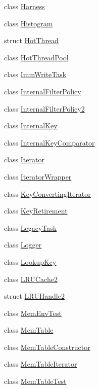 \begin{DoxyCompactItemize}
class \hyperlink{classleveldb_1_1_harness}{Harness}
\item 
class \hyperlink{classleveldb_1_1_histogram}{Histogram}
\item 
struct \hyperlink{structleveldb_1_1_hot_thread}{Hot\+Thread}
\item 
class \hyperlink{classleveldb_1_1_hot_thread_pool}{Hot\+Thread\+Pool}
\item 
class \hyperlink{classleveldb_1_1_imm_write_task}{Imm\+Write\+Task}
\item 
class \hyperlink{classleveldb_1_1_internal_filter_policy}{Internal\+Filter\+Policy}
\item 
class \hyperlink{classleveldb_1_1_internal_filter_policy2}{Internal\+Filter\+Policy2}
\item 
class \hyperlink{classleveldb_1_1_internal_key}{Internal\+Key}
\item 
class \hyperlink{classleveldb_1_1_internal_key_comparator}{Internal\+Key\+Comparator}
\item 
class \hyperlink{classleveldb_1_1_iterator}{Iterator}
\item 
class \hyperlink{classleveldb_1_1_iterator_wrapper}{Iterator\+Wrapper}
\item 
class \hyperlink{classleveldb_1_1_key_converting_iterator}{Key\+Converting\+Iterator}
\item 
class \hyperlink{classleveldb_1_1_key_retirement}{Key\+Retirement}
\item 
class \hyperlink{classleveldb_1_1_legacy_task}{Legacy\+Task}
\item 
class \hyperlink{classleveldb_1_1_logger}{Logger}
\item 
class \hyperlink{classleveldb_1_1_lookup_key}{Lookup\+Key}
\item 
class \hyperlink{classleveldb_1_1_l_r_u_cache2}{L\+R\+U\+Cache2}
\item 
struct \hyperlink{structleveldb_1_1_l_r_u_handle2}{L\+R\+U\+Handle2}
\item 
class \hyperlink{classleveldb_1_1_mem_env_test}{Mem\+Env\+Test}
\item 
class \hyperlink{classleveldb_1_1_mem_table}{Mem\+Table}
\item 
class \hyperlink{classleveldb_1_1_mem_table_constructor}{Mem\+Table\+Constructor}
\item 
class \hyperlink{classleveldb_1_1_mem_table_iterator}{Mem\+Table\+Iterator}
\item 
class \hyperlink{classleveldb_1_1_mem_table_test}{Mem\+Table\+Test}
\item 

\end{DoxyCompactItemize}
